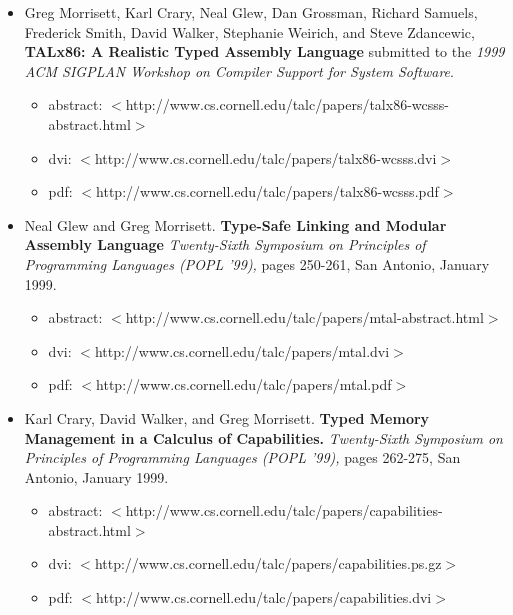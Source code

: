 \documentclass[titlepage,10pt]{article}
\begin{document}
\begin{itemize}

\item Greg Morrisett, Karl Crary, Neal Glew, Dan Grossman, Richard
Samuels, Frederick Smith, David Walker, Stephanie Weirich, and Steve
Zdancewic, \textbf{TALx86: A Realistic Typed Assembly Language}
submitted to the \textit{1999 ACM SIGPLAN Workshop on Compiler Support
for System Software}.

    \begin{itemize}
    \item abstract: $<$http://www.cs.cornell.edu/talc/papers/talx86-wcsss-abstract.html$>$
    \item dvi: $<$http://www.cs.cornell.edu/talc/papers/talx86-wcsss.dvi$>$
    \item pdf: $<$http://www.cs.cornell.edu/talc/papers/talx86-wcsss.pdf$>$
    \end{itemize}

\item Neal Glew and Greg Morrisett. \textbf{Type-Safe Linking and
Modular Assembly Language} \textit{Twenty-Sixth Symposium on Principles
of Programming Languages (POPL '99),} pages 250-261, San Antonio,
January 1999.

    \begin{itemize}
    \item abstract: $<$http://www.cs.cornell.edu/talc/papers/mtal-abstract.html$>$
    \item dvi: $<$http://www.cs.cornell.edu/talc/papers/mtal.dvi$>$
    \item pdf: $<$http://www.cs.cornell.edu/talc/papers/mtal.pdf$>$
    \end{itemize}

\item Karl Crary, David Walker, and Greg Morrisett. \textbf{Typed Memory
Management in a Calculus of Capabilities.} \textit{Twenty-Sixth
Symposium on Principles of Programming Languages (POPL '99), }pages
262-275, San Antonio, January 1999.

    \begin{itemize}
    \item abstract: $<$http://www.cs.cornell.edu/talc/papers/capabilities-abstract.html$>$
    \item dvi: $<$http://www.cs.cornell.edu/talc/papers/capabilities.ps.gz$>$
    \item pdf: $<$http://www.cs.cornell.edu/talc/papers/capabilities.dvi$>$
    \end{itemize}


\end{itemize}
\end{document}
